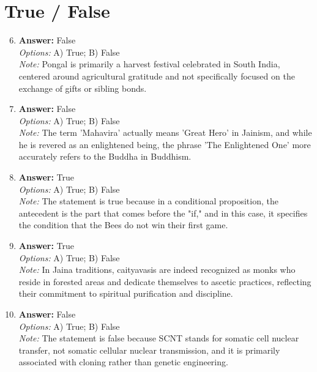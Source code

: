 \documentclass[12pt]{article}
\begin{document}
\section*{True / False}
\begin{enumerate}[label=\arabic*.]
\setcounter{enumi}{5}
\item \textbf{Answer:} False
\\ \textit{Options:} A) True; B) False
\\ \textit{Note:} Pongal is primarily a harvest festival celebrated in South India, centered around agricultural gratitude and not specifically focused on the exchange of gifts or sibling bonds.
\item \textbf{Answer:} False
\\ \textit{Options:} A) True; B) False
\\ \textit{Note:} The term 'Mahavira' actually means 'Great Hero' in Jainism, and while he is revered as an enlightened being, the phrase 'The Enlightened One' more accurately refers to the Buddha in Buddhism.
\item \textbf{Answer:} True
\\ \textit{Options:} A) True; B) False
\\ \textit{Note:} The statement is true because in a conditional proposition, the antecedent is the part that comes before the "if," and in this case, it specifies the condition that the Bees do not win their first game.
\item \textbf{Answer:} True
\\ \textit{Options:} A) True; B) False
\\ \textit{Note:} In Jaina traditions, caityavasis are indeed recognized as monks who reside in forested areas and dedicate themselves to ascetic practices, reflecting their commitment to spiritual purification and discipline.
\item \textbf{Answer:} False
\\ \textit{Options:} A) True; B) False
\\ \textit{Note:} The statement is false because SCNT stands for somatic cell nuclear transfer, not somatic cellular nuclear transmission, and it is primarily associated with cloning rather than genetic engineering.
\end{enumerate}
\end{document}
